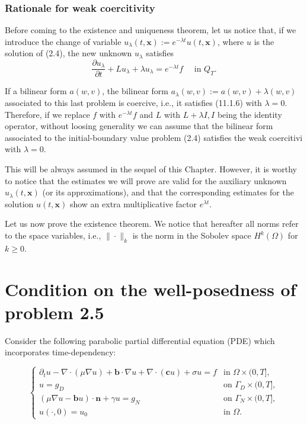 \documentclass[11pt]{book}
\begin{document}
\subsubsection{Rationale for weak coercitivity}
Before coming to the existence and uniqueness theorem, let us notice that, if we introduce the change of variable $u_\lambda(t, \mathbf{x}):=e^{-\lambda t} u(t, \mathbf{x})$, where $u$ is the solution of (2.4), the new unknown $u_\lambda$ satisfies
$$
\frac{\partial u_\lambda}{\partial t}+L u_\lambda+\lambda u_\lambda=e^{-\lambda t} f \quad \text { in } Q_T .
$$

If a bilinear form $a(w, v)$, the bilinear form $a_\lambda(w, v):=a(w, v)+\lambda(w, v)$ associated to this last problem is coercive, i.e., it satisfies (11.1.6) with $\lambda=0$. Therefore, if we replace $f$ with $e^{-\lambda t} f$ and $L$ with $L+\lambda I, I$ being the identity operator, without loosing generality we can assume that the bilinear form associated to the initial-boundary value problem (2.4) satisfies the weak coercitivi with $\lambda=0$.

This will be always assumed in the sequel of this Chapter. However, it is worthy to notice that the estimates we will prove are valid for the auxiliary unknown $u_\lambda(t, \mathbf{x})$ (or its approximations), and that the corresponding estimates for the solution $u(t, \mathbf{x})$ show an extra multiplicative factor $e^{\lambda t}$.

Let us now prove the existence theorem. We notice that hereafter all norms refer to the space variables, i.e., $\|\cdot\|_k$ is the norm in the Sobolev space $H^k(\Omega)$ for $k \geq 0$.



\section{Condition on the well-posedness of problem 2.5}
Consider the following parabolic partial differential equation (PDE) which incorporates time-dependency:

\[
\begin{cases}
\partial_t u -\nabla \cdot (\mu \nabla u) + \mathbf{b} \cdot \nabla u + \nabla \cdot (\mathbf{c}u)+ \sigma u = f & \text{in } \Omega \times (0,T], \\
u = g_D & \text{on } \Gamma_D \times (0,T], \\
(\mu \nabla u - \mathbf{b}u) \cdot \mathbf{n} + \gamma u = g_N & \text{on } \Gamma_N \times (0,T], \\
u(\cdot,0) = u_0 & \text{in } \Omega.
\end{cases}
\]
\end{document}
